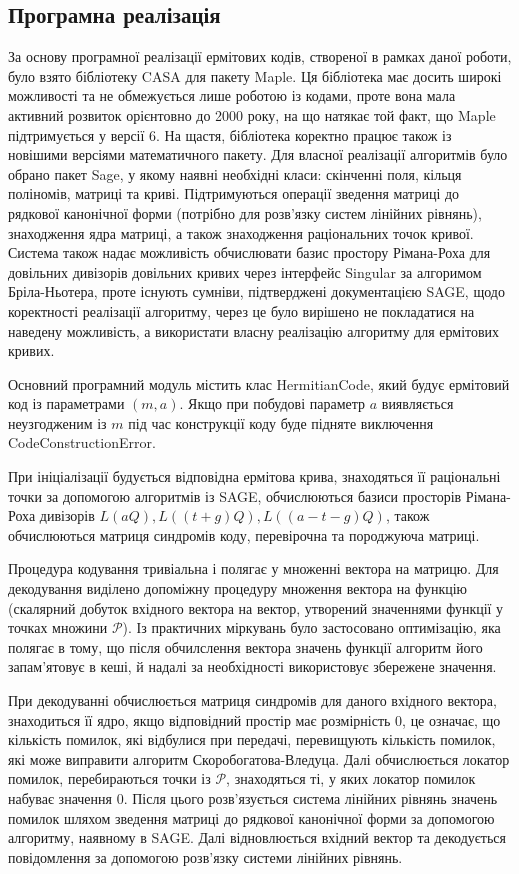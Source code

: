 \documentclass[a4paper,14pt,oneside]{extarticle}
\begin{document}
\subsection{Програмна реалізація}
За основу програмної реалізації ермітових кодів, створеної в рамках даної роботи, було взято бібліотеку CASA для пакету Maple. 
Ця бібліотека має досить широкі можливості та не обмежується лише роботою із кодами, проте вона мала активний розвиток орієнтовно до 2000 року, на 
що натякає той факт, що Maple підтримується у версії 6. На щастя, бібліотека коректно працює також із новішими версіями математичного пакету. 
Для власної реалізації алгоритмів було обрано пакет Sage, у якому наявні необхідні класи: скінченні поля, кільця поліномів, матриці та криві. 
Підтримуються операції зведення матриці до рядкової канонічної форми (потрібно для розв'язку систем лінійних рівнянь), знаходження ядра матриці, а 
також знаходження раціональних точок кривої. Система також надає можливість обчислювати базис простору Рімана-Роха для довільних дивізорів довільних 
кривих через інтерфейс Singular за алгоримом Бріла-Ньотера, проте існують сумніви, підтверджені документацією SAGE, щодо коректності реалізації 
алгоритму, через це було вирішено не покладатися на наведену можливість, а використати власну реалізацію алгоритму для ермітових кривих.

Основний програмний модуль містить клас HermitianCode, який будує ермітовий код із параметрами $(m, a)$. Якщо при побудові параметр $a$ виявляється 
неузгодженим із $m$ під час конструкції коду буде підняте виключення CodeConstructionError.

При ініціалізації будується відповідна ермітова крива, 
знаходяться її раціональні точки за допомогою алгоритмів із SAGE, обчислюються базиси просторів Рімана-Роха дивізорів $L(aQ), L( (t+g)Q), L( (a-t-g)Q)$, 
також обчислюються матриця синдромів коду, перевірочна та породжуюча матриці.

Процедура кодування тривіальна і полягає у множенні вектора на матрицю. Для декодування виділено допоміжну процедуру множення вектора на функцію 
(скалярний добуток вхідного вектора на вектор, утворений значеннями функції у точках множини $\mathcal{P}$). 
Із практичних міркувань було застосовано оптимізацію, яка полягає в тому, що після обчилслення вектора значень функції алгоритм його запам'ятовує в 
кеші, й надалі за необхідності використовує збережене значення.

При декодуванні обчислюється матриця синдромів для даного вхідного вектора, знаходиться її ядро, якщо відповідний простір має розмірність $0$, це 
означає, що кількість помилок, які відбулися при передачі, перевищують кількість помилок, які може виправити алгоритм Ско\-робогатова-Вледуца. Далі 
обчислюється локатор помилок, перебираються точки із $\mathcal{P}$, знаходяться ті, у яких локатор помилок набуває значення $0$. Після цього 
розв'язується система лінійних рівнянь значень помилок шляхом зведення матриці до рядкової канонічної форми за допомогою алгоритму, наявному в SAGE. 
Далі відновлюється вхідний вектор та декодується повідомлення за допомогою розв'язку системи лінійних рівнянь.
\end{document}
